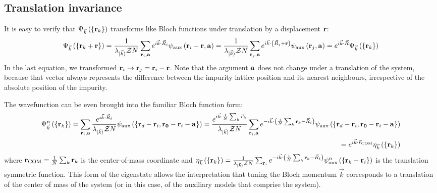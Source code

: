 \documentclass[reprint,hidelinks]{revtex4-2}
\begin{document}
\begin{widetext}
\subsection{Translation invariance}
It is easy to verify that \(\Psi_{\vec k}\left(\left\{ {\bf r}_k \right\}  \right) \) transforms like Bloch functions under translation by a displacement \({\bf r}\):
\begin{equation}\begin{aligned}
	\Psi_{\vec k}\left(\left\{{\bf r}_k + {\bf r}\right\} \right) = \frac{1}{\lambda_{\ket{\vec k}} \mathcal{Z} N}\sum_{{\bf r}_i,{\bf a}} e^{i \vec{k}\cdot\vec{R}_i} \psi_\text{aux}\left({\bf r}_i - {\bf r}, {\bf a}\right) = \frac{1}{\lambda_{\ket{\vec k}} \mathcal{Z} N}\sum_{{\bf r}_j, {\bf a}} e^{i \vec{k}\cdot\left(\vec{R}_j + {\bf r}\right)} \psi_\text{aux}\left({\bf r}_j, {\bf a}\right) = e^{i \vec{k}\cdot\vec{R}} \Psi_{\vec k}\left(\left\{ {\bf r}_k \right\} \right)
\end{aligned}\end{equation}
In the last equation, we transformed \({\bf r}_i \to {\bf r}_j = {\bf r}_i - {\bf r}\). Note that the argument \({\bf a}\) does not change under a translation of the system, because that vector always represents the difference between the impurity lattice position and its nearest neighbours, irrespective of the absolute position of the impurity.

The wavefunction can be even brought into the familiar Bloch function form:
\begin{equation}\begin{aligned}
	\Psi^n_{\vec k}\left(\left\{{\bf r}_k\right\}\right) = \sum_{{\bf r}_i, {\bf a}} \frac{e^{i \vec{k}\cdot\vec{R}_i}}{\lambda_{\ket{\vec k}} \mathcal{Z} N} \psi_\text{aux}\left(\left\{ {\bf r}_d - {\bf r}_i, {\bf r_0} - {\bf r}_i - {\bf a} \right\} \right) = \frac{e^{i \vec{k}\cdot\frac{1}{N}\sum_k \vec{r}_k}}{\lambda_{\ket{\vec k}} \mathcal{Z} N}\sum_{{\bf r}_i, {\bf a}} e^{-i \vec{k}\cdot\left(\frac{1}{N}\sum_k{\bf r}_k - \vec{R}_i\right)} \psi_\text{aux}\left(\left\{ {\bf r}_d - {\bf r}_i, {\bf r_0} - {\bf r}_i - {\bf a} \right\} \right) \\
	= e^{i \vec{k}\cdot\vec{r}_\text{COM}} \eta_{\vec k}\left(\left\{{\bf r}_k\right\}\right)
\end{aligned}\end{equation}
where \({\bf r}_\text{COM} = \frac{1}{N}\sum_k {\bf r}_k\) is the center-of-mass coordinate and \(\eta_{\vec k}\left(\left\{{\bf r}_k\right\}\right) = \frac{1}{\lambda_{\ket{\vec k}} \mathcal{Z} N}\sum_{{\bf r}_i} e^{-i \vec{k}\cdot\left(\frac{1}{N}\sum_k{\bf r}_k - \vec{R}_i\right)} \psi^n_\text{aux}\left(\left\{{\bf r}_k - {\bf r}_i\right\}\right)\) is the translation symmetric function. This form of the eigenstate allows the interpretation that tuning the Bloch momentum \(\vec k\) corresponds to a translation of the center of mass of the system (or in this case, of the auxiliary models that comprise the system).


\end{widetext}
\end{document}
